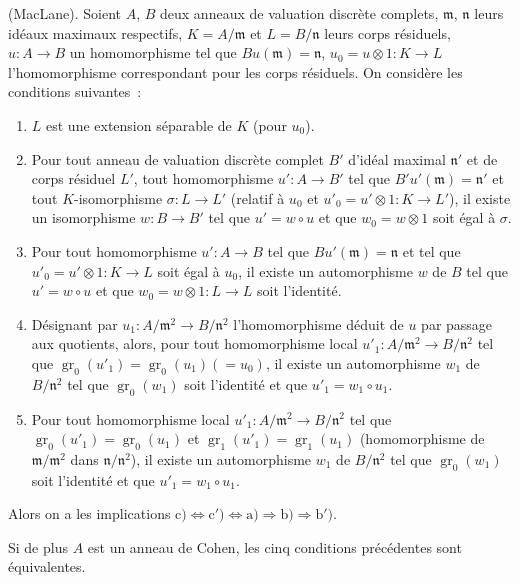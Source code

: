 \begin{proposition}[21.5.2]
\label{0.21.5.2-fr}
\textnormal{(MacLane).}
Soient $A$, $B$ deux anneaux de valuation discrète complets, $\mathfrak m$,
$\mathfrak n$ leurs idéaux maximaux respectifs, $K=A/\mathfrak m$ et
$L=B/\mathfrak n$ leurs corps résiduels, $u:A\to B$ un homomorphisme tel que
$Bu(\mathfrak m)=\mathfrak n$, $u_0=u\otimes 1:K\to L$ l'homomorphisme
correspondant pour les corps résiduels. On considère les conditions suivantes~:
\begin{enumerate}
  \item[\rm a)] $L$ est une extension séparable de $K$ (pour $u_0$).
  \item[\rm b)] Pour tout anneau de valuation discrète complet $B'$ d'idéal
  maximal $\mathfrak n'$ et de corps résiduel $L'$,
  tout homomorphisme
  $u':A\to B'$ tel que $B'u'(\mathfrak m)=\mathfrak n'$ et tout
  $K$-isomorphisme $\sigma:L\to L'$ (relatif à $u_0$ et
  $u'_0=u'\otimes1:K\to L'$), il existe un isomorphisme $w:B\to B'$ tel que
  $u'=w\circ u$ et que $w_0=w\otimes1$ soit égal à $\sigma$.
  \item[\rm b$'$)] Pour tout homomorphisme $u':A\to B$ tel que
  $Bu'(\mathfrak m)=\mathfrak n$ et tel que $u'_0=u'\otimes1:K\to L$ soit égal
  à $u_0$, il existe un automorphisme $w$ de $B$ tel que $u'=w\circ u$ et que
  $w_0=w\otimes1:L\to L$ soit l'identité.
  \item[\rm c)] Désignant par $u_1:A/\mathfrak m^2\to B/\mathfrak n^2$
  l'homomorphisme déduit de $u$ par passage aux quotients, alors, pour tout
  homomorphisme local $u'_1:A/\mathfrak m^2\to B/\mathfrak n^2$ tel que
  $\operatorname{gr}_0(u'_1)=\operatorname{gr}_0(u_1)(=u_0)$, il existe un
  automorphisme $w_1$ de $B/\mathfrak n^2$ tel que
  $\operatorname{gr}_0(w_1)$ soit l'identité et que $u'_1=w_1\circ u_1$.
  \item[\rm c$'$)] Pour tout homomorphisme local $u'_1:A/\mathfrak m^2\to
  B/\mathfrak n^2$ tel que $\operatorname{gr}_0(u'_1)=\operatorname{gr}_0(u_1)$
  et $\operatorname{gr}_1(u'_1)=\operatorname{gr}_1(u_1)$
  (homomorphisme de $\mathfrak m/\mathfrak m^2$ dans
  $\mathfrak n/\mathfrak n^2$), il existe un automorphisme $w_1$ de
  $B/\mathfrak n^2$ tel que $\operatorname{gr}_0(w_1)$ soit l'identité et que
  $u'_1=w_1\circ u_1$.
\end{enumerate}

 Alors on a les implications $\mathrm{c})\Leftrightarrow\mathrm{c}')\Leftrightarrow\mathrm{a})\Rightarrow\mathrm{b})
 \Rightarrow\mathrm{b}')$.

Si de plus $A$ est un anneau de Cohen, les cinq conditions
précédentes sont équivalentes.

\end{proposition}
